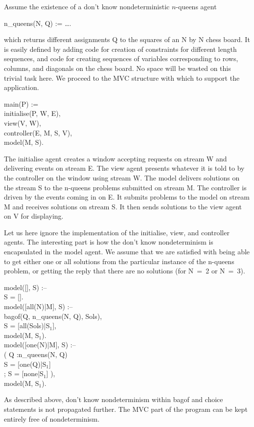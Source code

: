 Assume the existence of a don't know nondeterministic $n$-queens agent
%
\begin{program}
n_queens(N, Q) := \dots.
\end{program}%
%
which returns different assignments {\prog Q} to the squares of an
{\prog N} by {\prog N} chess board.  It is easily defined by adding
code for creation of constraints for different length sequences, and
code for creating sequences of variables corresponding to rows,
columns, and diagonals on the chess board.  No space will be wasted on
this trivial task here.  We proceed to the MVC structure with which to
support the application.
%
\begin{program}
main(P) := \\
\>\>	initialise(P, W, E), \\
\>\>	view(V, W), \\
\>\>	controller(E, M, S, V), \\
\>\>	model(M, S).
\end{program}%
%
The initialise agent creates a window accepting requests on stream
{\prog W} and delivering events on stream {\prog E}.  The view agent
presents whatever it is told to by the controller on the window using
stream {\prog W}.  The model delivers solutions on the stream {\prog
S} to the n-queens problems submitted on stream {\prog M}.  The
controller is driven by the events coming in on {\prog E}.  It submits
problems to the model on stream {\prog M} and receives solutions on
stream {\prog S}.  It then sends solutions to the view agent on {\prog
V} for displaying.

Let us here ignore the implementation of the initialise, view, and
controller agents.  The interesting part is how the don't know
nondeterminism is encapsulated in the model agent.  We assume that we
are satisfied with being able to get either one or all solutions from
the particular instance of the n-queens problem, or getting the reply
that there are no solutions (for {\prog N~=~2} or {\prog N~=~3)}.
%
\begin{program}
model([], S) :-- \\
\>\cond\>	S = [].  \\
model([all(N)|M], S) :-- \\
\>\cond\>	bagof(Q, n_queens(N, Q), Sols), \\
\>\>	S = [all(Sols)|S$_1$], \\
\>\>	model(M, S$_1$).  \\
model([one(N)|M], S) :-- \\
\>\cond\>	( Q :\>\>n_queens(N, Q) \\
\>\>		\>\cond\>S = [one(Q)|S$_1$] \\
\>\>	; 	\>\>S = [none|S$_1$] ), \\
\>\>	model(M, S$_1$).
\end{program}%
%
As described above, don't know nondeterminism within bagof and choice
statements is not propagated further.  The MVC part of the program can
be kept entirely free of nondeterminism.

